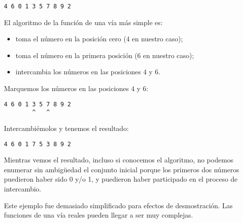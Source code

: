 \begin{lstlisting}
4 6 0 1 3 5 7 8 9 2
\end{lstlisting}

El algoritmo de la funci\'on de una v\'ia m\'as simple es:

\begin{itemize}
\item toma el n\'umero en la posici\'on cero (4 en nuestro caso);
\item toma el n\'umero en la primera posici\'on (6 en nuestro caso);
\item intercambia los n\'umeros en las posiciones 4 y 6.
\end{itemize}

Marquemos los n\'umeros en las posiciones 4 y 6:

\begin{lstlisting}
4 6 0 1 3 5 7 8 9 2
        ^   ^
\end{lstlisting}

Intercambi\'emolos y tenemos el resultado:

\begin{lstlisting}
4 6 0 1 7 5 3 8 9 2
\end{lstlisting}

Mientras vemos el resultado, incluso si conocemos el algoritmo, no podemos enumerar sin ambig\"uedad el conjunto inicial
porque los primeros dos n\'umeros puedieron haber sido 0 y/o 1, y puedieron haber participado en el proceso de intercambio.

Este ejemplo fue demasiado simplificado para efectos de desmostraci\'on. Las funciones de una v\'ia reales pueden llegar a ser muy complejas.
